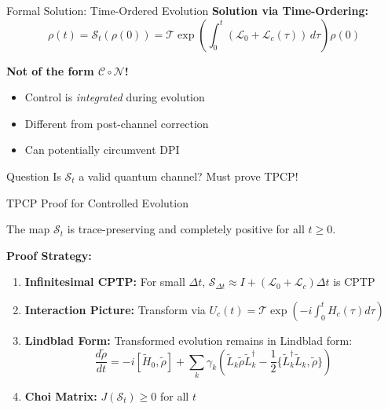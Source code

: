 \documentclass[aspectratio=169,12pt]{beamer}
\newcommand{\Lgen}{\mathcal{L}}
\newcommand{\SJ}{\mathcal{S}}
\newcommand{\T}{\mathcal{T}}
\begin{document}
\begin{frame}{Formal Solution: Time-Ordered Evolution}
\textbf{Solution via Time-Ordering:}
\begin{equation*}
\rho(t) = \SJ_t(\rho(0)) = \T \exp\left( \int_0^t (\Lgen_0 + \Lgen_c(\tau)) \, d\tau \right) \rho(0)
\end{equation*}

\vspace{0.3cm}

\textbf{Not of the form $\mathcal{C} \circ \mathcal{N}$!}
\begin{itemize}
\item Control is \textit{integrated} during evolution
\item Different from post-channel correction
\item Can potentially circumvent DPI
\end{itemize}

\vspace{0.3cm}

\begin{alertblock}{Question}
Is $\SJ_t$ a valid quantum channel? Must prove TPCP!
\end{alertblock}
\end{frame}

\begin{frame}{TPCP Proof for Controlled Evolution}
\begin{theorem}
The map $\SJ_t$ is trace-preserving and completely positive for all $t \geq 0$.
\end{theorem}

\vspace{0.3cm}

\textbf{Proof Strategy:}
\begin{enumerate}
\item \textbf{Infinitesimal CPTP:} For small $\Delta t$, $\SJ_{\Delta t} \approx I + (\Lgen_0 + \Lgen_c)\Delta t$ is CPTP
\item \textbf{Interaction Picture:} Transform via $U_c(t) = \T \exp(-i\int_0^t H_c(\tau) d\tau)$
\item \textbf{Lindblad Form:} Transformed evolution remains in Lindblad form:
$$\frac{d\tilde{\rho}}{dt} = -i[\tilde{H}_0, \tilde{\rho}] + \sum_k \gamma_k \left( \tilde{L}_k \tilde{\rho} \tilde{L}_k^\dagger - \frac{1}{2} \{ \tilde{L}_k^\dagger \tilde{L}_k, \tilde{\rho} \} \right)$$
\item \textbf{Choi Matrix:} $J(\SJ_t) \geq 0$ for all $t$
\end{enumerate}
\end{frame}
\end{document}

